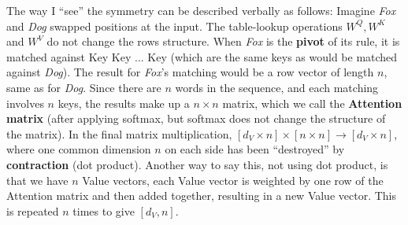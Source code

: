 The way I ``see'' the symmetry can be described verbally as follows:  Imagine \textit{Fox} and \textit{Dog} swapped positions at the input.  The table-lookup operations $W^Q, W^K$ and $W^V$ do not change the rows structure.  When \textit{Fox} is the \textbf{pivot} of its rule, it is matched against Key Key ... Key (which are the same keys as would be matched against \textit{Dog}).  The result for \textit{Fox}'s matching would be a row vector of length $n$, same as for \textit{Dog}.  Since there are $n$ words in the sequence, and each matching involves $n$ keys, the results make up a $n \times n$ matrix, which we call the \textbf{Attention matrix} (after applying softmax, but softmax does not change the structure of the matrix).  In the final matrix multiplication, $[d_V \times n] \times [n \times n] \rightarrow [d_V \times n]$, where one common dimension $n$ on each side has been ``destroyed'' by \textbf{contraction} (dot product).  Another way to say this, not using dot product, is that we have $n$ Value vectors, each Value vector is weighted by one row of the Attention matrix and then added together, resulting in a new Value vector.  This is repeated $n$ times to give $[d_V, n]$.

